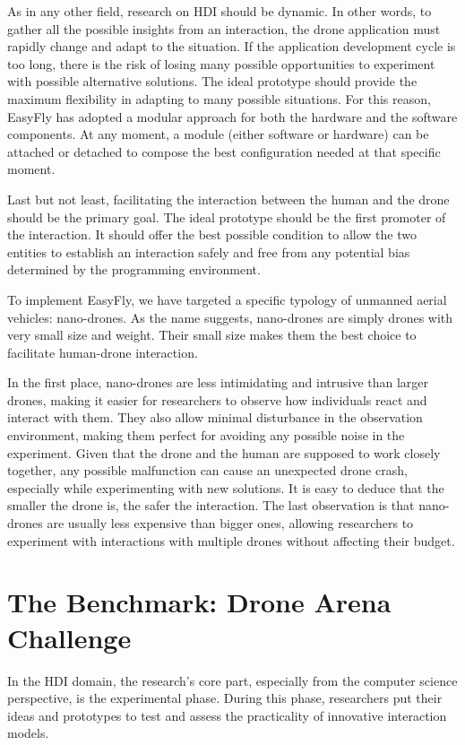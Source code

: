 As in any other field, research on HDI should be dynamic. In other words, to gather all the possible
insights from an interaction, the drone application must rapidly change and adapt to the situation.
If the application development cycle is too long, there is the risk of losing many possible opportunities to
experiment with possible alternative solutions. The ideal prototype should provide the maximum flexibility in adapting
to many possible situations.
For this reason, EasyFly has adopted a modular approach for both the hardware and the software components.
At any moment, a module (either software or hardware) can be attached or detached to compose the best configuration
needed at that specific moment.

Last but not least, facilitating the interaction between the human and the drone should be the primary goal.
The ideal prototype should be the first promoter of the interaction. It should offer the best possible condition to
allow the two entities to establish an interaction safely and free from any potential bias determined by the programming environment.

To implement EasyFly, we have targeted a specific typology of unmanned aerial vehicles: nano-drones.
As the name suggests, nano-drones are simply drones with very small size and weight. Their small size makes them the best choice to facilitate human-drone interaction.

In the first place, nano-drones are less intimidating and intrusive than larger drones, making it easier for
researchers to observe how individuals react and interact with them. They also allow minimal disturbance in the
observation environment, making them perfect for avoiding any possible noise in the experiment.
Given that the drone and the human are supposed to work closely together, any possible malfunction can cause an unexpected drone crash, 
especially while experimenting with new solutions. It is easy to deduce that the smaller the drone is, the safer the interaction.
The last observation is that nano-drones are usually less expensive than bigger ones, allowing researchers
to experiment with interactions with multiple drones without affecting their budget.


\section{The Benchmark: Drone Arena Challenge}\label{sec:the_benchmark}
In the HDI domain, the research's core part, especially from the computer science perspective,
is the experimental phase. During this phase, researchers put their ideas and prototypes to test
and assess the practicality of innovative interaction models.

